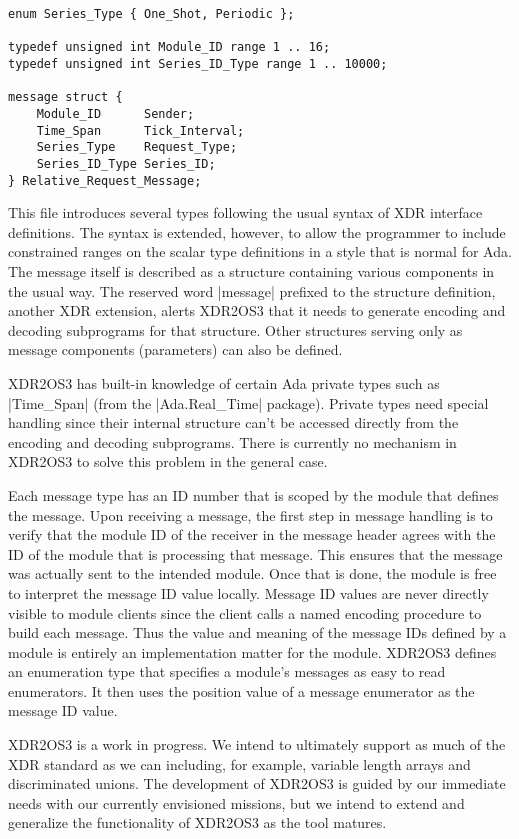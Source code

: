 \begin{verbatim}
enum Series_Type { One_Shot, Periodic };

typedef unsigned int Module_ID range 1 .. 16;
typedef unsigned int Series_ID_Type range 1 .. 10000;

message struct {
    Module_ID      Sender;
    Time_Span      Tick_Interval;
    Series_Type    Request_Type;
    Series_ID_Type Series_ID;
} Relative_Request_Message;
\end{verbatim}

This file introduces several types following the usual syntax of XDR interface definitions. The
syntax is extended, however, to allow the programmer to include constrained ranges on the scalar
type definitions in a style that is normal for Ada. The message itself is described as a
structure containing various components in the usual way. The reserved word |message| prefixed
to the structure definition, another XDR extension, alerts XDR2OS3 that it needs to generate
encoding and decoding subprograms for that structure. Other structures serving only as message
components (parameters) can also be defined.

XDR2OS3 has built-in knowledge of certain Ada private types such as |Time_Span| (from the
|Ada.Real_Time| package). Private types need special handling since their internal structure
can't be accessed directly from the encoding and decoding subprograms. There is currently no
mechanism in XDR2OS3 to solve this problem in the general case.

Each message type has an ID number that is scoped by the module that defines the message. Upon
receiving a message, the first step in message handling is to verify that the module ID of the
receiver in the message header agrees with the ID of the module that is processing that message.
This ensures that the message was actually sent to the intended module. Once that is done, the
module is free to interpret the message ID value locally. Message ID values are never directly
visible to module clients since the client calls a named encoding procedure to build each
message. Thus the value and meaning of the message IDs defined by a module is entirely an
implementation matter for the module. XDR2OS3 defines an enumeration type that specifies a
module's messages as easy to read enumerators. It then uses the position value of a message
enumerator as the message ID value.

XDR2OS3 is a work in progress. We intend to ultimately support as much of the XDR standard as we
can including, for example, variable length arrays and discriminated unions. The development of
XDR2OS3 is guided by our immediate needs with our currently envisioned missions, but we intend to extend and
generalize the functionality of XDR2OS3 as the tool matures.

